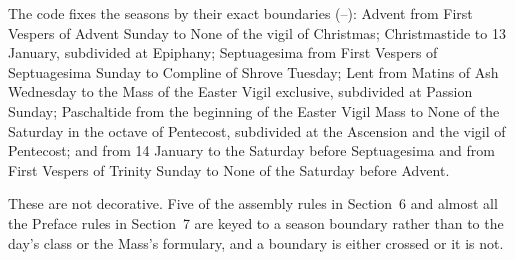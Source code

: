 The code fixes the seasons by their exact boundaries (--):
Advent from First Vespers of Advent Sunday to None of the vigil of Christmas;
Christmastide to 13 January, subdivided at Epiphany; Septuagesima from First
Vespers of Septuagesima Sunday to Compline of Shrove Tuesday; Lent from Matins
of Ash Wednesday to the Mass of the Easter Vigil exclusive, subdivided at
Passion Sunday; Paschaltide from the beginning of the Easter Vigil Mass to
None of the Saturday in the octave of Pentecost, subdivided at the Ascension
and the vigil of Pentecost; and  from 14 January
to the Saturday before Septuagesima and from First Vespers of Trinity Sunday
to None of the Saturday before Advent.

These are not decorative. Five of the assembly rules in Section~6 and almost
all the Preface rules in Section~7 are keyed to a season boundary rather than
to the day's class or the Mass's formulary, and a boundary is either crossed
or it is not.

